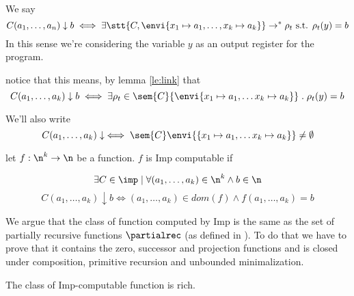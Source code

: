 \begin{notation}
  We say \[C(a_1,\dots, a_n)\downarrow b \iff \exists \stt{C,
    \envi{x_1 \mapsto a_1, \dots, x_k \mapsto a_k}} \to^* \rho_t
  \text{ s.t. } \rho_t(y) = b\] In this sense we're considering the
  variable \(y\) as an output register for the program.
\end{notation}

\begin{observation}
  notice that this means, by lemma \ref{le:link} that \[C(a_1, \dots,
  a_k) \downarrow b \iff \exists \rho_t \in \sem{C}\{\envi{x_1 \mapsto
    a_1, \dots x_k \mapsto a_k}\} \; . \; \rho_t(y) = b\]
\end{observation}

\begin{notation}
  We'll also write \[C(a_1, \dots, a_k) \downarrow \iff
  \sem{C}\envi{\{x_1 \mapsto a_1, \dots x_k \mapsto a_k}\} \neq
  \emptyset\]
\end{notation}

\begin{definition}
  let \(f : \n^k \to \n\) be a function. \(f\) is Imp computable if

  \[\exists C \in\imp \mid \forall (a_1, \dots, a_k) \in \n^k \wedge
  b \in \n \] \[C(a_1, \dots, a_k) \downarrow b \iff (a_1, \dots,
  a_k) \in dom(f) \wedge f(a_1,\dots,a_k) = b\]
\end{definition}

We argue that the class of function computed by Imp is the same as the
set of partially recursive functions \(\partialrec\) (as defined in
\cite{cutland1980computability}). To do that we have to prove that it
contains the zero, successor and projection functions and is closed
under composition, primitive recursion and unbounded minimalization.

\begin{lemma}
  The class of Imp-computable function is rich.
\end{lemma}

